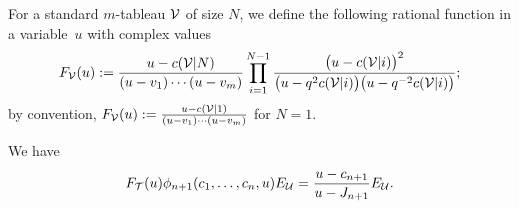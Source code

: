 For a standard $m$-tableau ${\cal{V}}$ of size $N$, we def\/ine
the following rational function in a variab\-le~$u$ with complex values
\begin{gather}\label{def-F1}
F_{{\cal{V}}}(u):=\frac{u-c({\cal{V}}|N)}{(u-v_1)\cdots(u-v_m)}\prod_{i=1}^{N-1}\frac{\bigl(u-c({\cal{V}}|i)\bigr)^2}
{\bigl(u-q^2c({\cal{V}}|i)\bigr)\bigl(u-q^{-2}c({\cal{V}}|i)\bigr)} ;
\end{gather}
by convention,
$F_{{\cal{V}}}(u):= \frac{u-c({\cal{V}}|1)}{(u-v_1)\cdots(u-v_m)} $
for $N=1$.

\begin{Proposition} \label{prop-idem11}
We have
\begin{gather}\label{eq-idem11}
F_{{\cal{T}}}(u)\phi_{n+1}(c_1,\dots,c_n,u)E_{{\cal{U}}}=\frac{u-c_{n+1}}{u-J_{n+1}}  E_{{\cal{U}}}.
\end{gather}
\end{Proposition}

